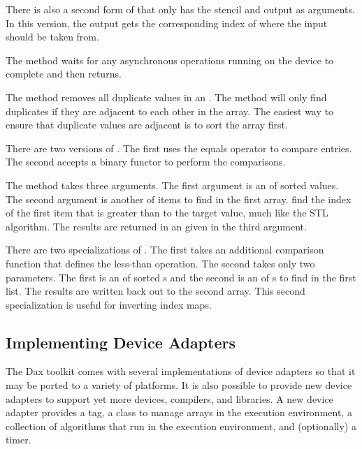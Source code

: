 \begin{description}
  There is also a second form of  that only
  has the stencil and output as arguments. In this version, the output gets
  the corresponding index of where the input should be taken from.
\item[\textcode{Synchronize}]  The
   method waits for any asynchronous operations
  running on the device to complete and then returns.
\item[\textcode{Unique}]  The  method
  removes all duplicate values in an . The
  method will only find duplicates if they are adjacent to each other in
  the array. The easiest way to ensure that duplicate values are adjacent
  is to sort the array first.

  There are two versions of . The first uses the equals
  operator to compare entries. The second accepts a binary functor to
  perform the comparisons.
\item[\textcode{UpperBounds}]  The
   method takes three arguments. The first argument
  is an  of sorted values. The second argument
  is another  of items to find in the first
  array.  find the index of the first item that is
  greater than to the target value, much like the
   STL algorithm. The results are returned in
  an  given in the third argument.

  There are two specializations of . The first takes
  an additional comparison function that defines the less-than
  operation. The second takes only two parameters. The first is an
   of sorted s and the second is an
   of s to find in the first list. The
  results are written back out to the second array. This second
  specialization is useful for inverting index maps.
\end{description}


\subsection{Implementing Device Adapters}
\label{sec:ImplementingDeviceAdapters}

The Dax toolkit comes with several implementations of device adapters so
that it may be ported to a variety of platforms. It is also possible to
provide new device adapters to support yet more devices, compilers, and
libraries. A new device adapter provides a tag, a class to manage arrays in
the execution environment, a collection of algorithms that run in the
execution environment, and (optionally) a timer.

